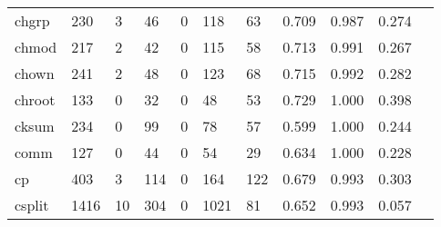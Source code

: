 \begin{longtable}{lp{1.10cm}p{1.10cm}p{1.10cm}p{1.10cm}p{1.10cm}p{1.10cm}p{1.10cm}p{1.10cm}p{1.10cm}p{1.10cm}}
chgrp     &                    230 &                                  3 &                                46 &                                0 &                               118 &                              63 &                          0.709 &                                 0.987 &                               0.274 \\
chmod     &                    217 &                                  2 &                                42 &                                0 &                               115 &                              58 &                          0.713 &                                 0.991 &                               0.267 \\
chown     &                    241 &                                  2 &                                48 &                                0 &                               123 &                              68 &                          0.715 &                                 0.992 &                               0.282 \\
chroot    &                    133 &                                  0 &                                32 &                                0 &                                48 &                              53 &                          0.729 &                                 1.000 &                               0.398 \\
cksum     &                    234 &                                  0 &                                99 &                                0 &                                78 &                              57 &                          0.599 &                                 1.000 &                               0.244 \\
comm      &                    127 &                                  0 &                                44 &                                0 &                                54 &                              29 &                          0.634 &                                 1.000 &                               0.228 \\
cp        &                    403 &                                  3 &                               114 &                                0 &                               164 &                             122 &                          0.679 &                                 0.993 &                               0.303 \\
csplit    &                   1416 &                                 10 &                               304 &                                0 &                              1021 &                              81 &                          0.652 &                                 0.993 &                               0.057 \\

\end{longtable}

